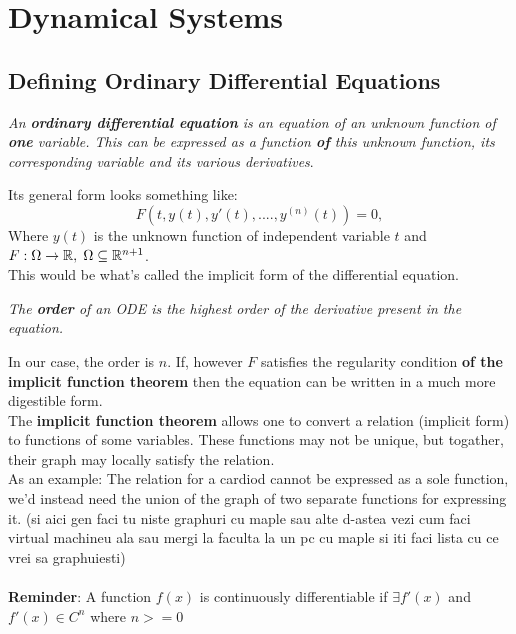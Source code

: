\chapter{Dynamical Systems}
\label{chap:ch3}


\section{Defining Ordinary Differential Equations}
\begin{definition}
    \textit{An \textbf{ordinary differential equation} is an equation of an unknown function of \textbf{one} variable. This can be expressed as a function \textbf{of} this unknown function, its corresponding variable and its various derivatives}.
\end{definition}
Its general form looks something like:
\begin{equation}\label{eq:3.1.1}
    F(t,y(t),y'(t),....,y^{(n)}(t))=0,
\end{equation}
Where $y(t)$ is the unknown function of independent variable $t$ and $F : \Omega \rightarrow \mathbb{R},\hspace{0.1cm}\Omega \subseteq \mathbb{R}^{n+1}$. \\
This would be what's called the implicit form of the differential equation.

\begin{definition}
    \textit{The \textbf{order} of an ODE is the highest order of the derivative present in the equation.}
\end{definition}
In our case, the order is $n$.
If, however $F$ satisfies the regularity condition \textbf{of the implicit function theorem} then the equation can be written in a much more digestible form. \\

The \textbf{implicit function theorem} allows one to convert a relation (implicit form) to functions of some variables. These functions may not be unique, but togather, their graph may locally satisfy the relation. \\
As an example: The relation for a cardiod cannot be expressed as a sole function, we'd instead need the union of the graph of two separate functions for expressing it.
(si aici gen faci tu niste graphuri cu maple sau alte d-astea vezi cum faci virtual machineu ala sau mergi la faculta la un pc cu maple si iti faci lista cu ce vrei sa graphuiesti) \\ \\
\textbf{Reminder}: A function $f(x)$ is continuously differentiable if $\exists f'(x)$ and $f'(x) \in C^n$ where $n>=0$

